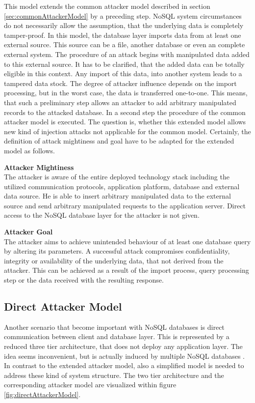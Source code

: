 This model extends the common attacker model described in section \ref{sec:commonAttackerModel} by a preceding step. NoSQL system circumstances do not necessarily allow the assumption, that the underlying data is completely tamper-proof. In this model, the database layer imports data from at least one external source. This source can be a file, another database or even an complete external system. The procedure of an attack begins with manipulated data added to this external source. It has to be clarified, that the added data can be totally eligible in this context. Any import of this data, into another system leads to a tampered data stock. The degree of attacker influence depends on the import processing, but in the worst case, the data is transferred one-to-one. This means, that such a preliminary step allows an attacker to add arbitrary manipulated records to the attacked database. In a second step the procedure of the common attacker model is executed. The question is, whether this extended model allows new kind of injection attacks not applicable for the common model. Certainly, the definition of attack mightiness and goal have to be adapted for the extended model as follows. \\

\begin{minipage}[t]{0.48\textwidth}
  \textbf{Attacker Mightiness} \\ 
  The attacker is aware of the entire deployed technology stack including the utilized communication protocols, application platform, database and external data source. He is able to insert arbitrary manipulated data to the external source and send arbitrary manipulated requests to the application server. Direct access to the NoSQL database layer for the attacker is not given.
\end{minipage}
\hfill
\begin{minipage}[t]{0.48\textwidth}
  \textbf{Attacker Goal} \\ 
  The attacker aims to achieve unintended behaviour of at least one database query by altering its parameters. A successful attack compromises confidentiality, integrity or availability of the underlying data, that not derived from the attacker. This can be achieved as a result of the import process, query processing step or the data received with the resulting response.
\end{minipage}

\subsection{Direct Attacker Model}
Another scenario that become important with NoSQL databases is direct communication between client and database layer. This is represented by a reduced three tier architecture, that does not deploy any application layer. The idea seems inconvenient, but is actually induced by multiple NoSQL databases \cite{Anderson:2010a}. In contrast to the extended attacker model, also a simplified model is needed to address these kind of system structure. The two tier architecture and the corresponding attacker model are visualized within figure \ref{fig:directAttackerModel}.

